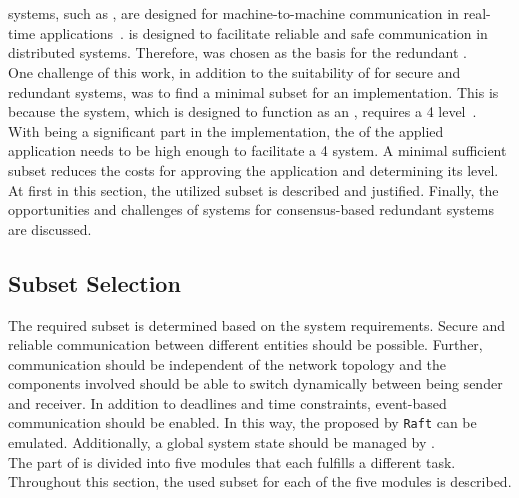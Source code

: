 \section{}

 systems, such as , are designed for machine-to-machine communication in real-time applications~\cite{omgDDSspec}.
 is designed to facilitate reliable and safe communication in distributed systems.
Therefore,  was chosen as the basis for the redundant .
\\

One challenge of this work, in addition to the suitability of  for secure and redundant systems, was to find a minimal subset for an implementation.
This is because the system, which is designed to function as an , requires a  4 level~\cite{ChakrabortyFaultTolerantRailway}.
With  being a significant part in the implementation, the  of the applied  application needs to be high enough to facilitate a  4 system.
A minimal sufficient  subset reduces the costs for approving the  application and determining its  level.
\\

At first in this section, the utilized  subset is described and justified.
Finally, the opportunities and challenges of  systems for consensus-based redundant systems are discussed.

\subsection{Subset Selection}

The required subset is determined based on the system requirements.
Secure and reliable communication between different entities should be possible.
Further, communication should be independent of the network topology and the components involved should be able to switch dynamically between being sender and receiver.
In addition to deadlines and time constraints, event-based communication should be enabled.
In this way, the  proposed by \texttt{Raft} can be emulated.
Additionally, a global system state should be managed by .
\\

The  part of  is divided into five modules that each fulfills a different task.
Throughout this section, the used subset for each of the five modules is described.
\\


